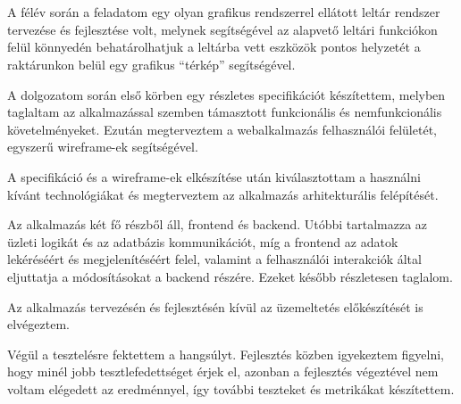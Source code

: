 \chapter{\bevezetes}

A félév során a feladatom egy olyan grafikus rendszerrel ellátott leltár rendszer tervezése és fejlesztése volt, melynek segítségével az alapvető leltári funkciókon felül könnyedén behatárolhatjuk a leltárba vett eszközök pontos helyzetét a raktárunkon belül egy grafikus “térkép” segítségével.

A dolgozatom során első körben egy részletes specifikációt készítettem, melyben taglaltam az alkalmazással szemben támasztott funkcionális és nemfunkcionális követelményeket. Ezután megterveztem a webalkalmazás felhasználói felületét, egyszerű wireframe-ek segítségével.

A specifikáció és a wireframe-ek elkészítése után kiválasztottam a használni kívánt technológiákat és megterveztem az alkalmazás arhitekturális felépítését.

Az alkalmazás két fő részből áll, frontend és backend. Utóbbi tartalmazza az üzleti logikát és az adatbázis kommunikációt, míg a frontend az adatok lekéréséért és megjelenítéséért felel, valamint a felhasználói interakciók által eljuttatja a módosításokat a backend részére. Ezeket később részletesen taglalom.

Az alkalmazás tervezésén és fejlesztésén kívül az üzemeltetés előkészítését is elvégeztem.

Végül a tesztelésre fektettem a hangsúlyt. Fejlesztés közben igyekeztem figyelni, hogy minél jobb tesztlefedettséget érjek el, azonban a fejlesztés végeztével nem voltam elégedett az eredménnyel, így további teszteket és metrikákat készítettem.
